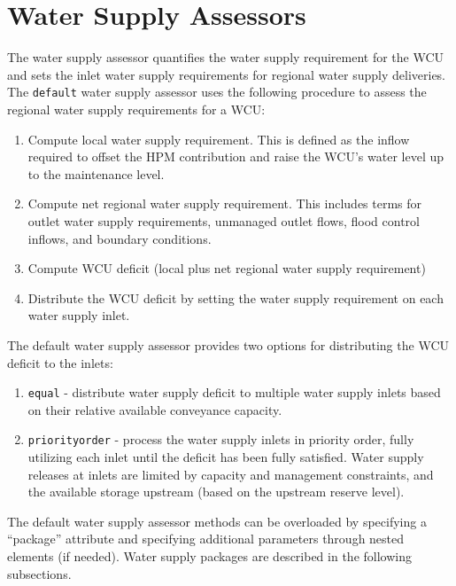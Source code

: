 \section{Water Supply Assessors}\label{wsAssessor}

The water supply assessor quantifies the water supply requirement for
the WCU and sets the inlet water supply requirements for regional
water supply deliveries.  The {\tt default} water supply assessor uses
the following procedure to assess the regional water supply
requirements for a WCU:

\begin{enumerate}
 \item Compute local water supply requirement.  This is defined as
   the inflow required to offset the HPM contribution and raise the
   WCU's water level up to the maintenance level.

 \item Compute net regional water supply requirement.  This includes
   terms for outlet water supply requirements, unmanaged outlet flows,
   flood control inflows, and boundary conditions.

 \item Compute WCU deficit (local plus net regional water supply
   requirement)

 \item Distribute the WCU deficit by setting the water supply
   requirement on each water supply inlet.

\end{enumerate}

The default water supply assessor provides two options for
distributing the WCU deficit to the inlets:

\begin{enumerate}

 \item {\tt equal} \-- distribute water supply deficit to multiple
   water supply inlets based on their relative available conveyance
   capacity.

 \item {\tt priorityorder} \-- process the water supply inlets in
   priority order, fully utilizing each inlet until the deficit has
   been fully satisfied.  Water supply releases at inlets are limited
   by capacity and management constraints, and the available storage
   upstream (based on the upstream reserve level).

\end{enumerate}

The default water supply assessor methods can be overloaded by
specifying a ``package'' attribute and specifying additional
parameters through nested elements (if needed).  Water supply packages
are described in the following subsections.
